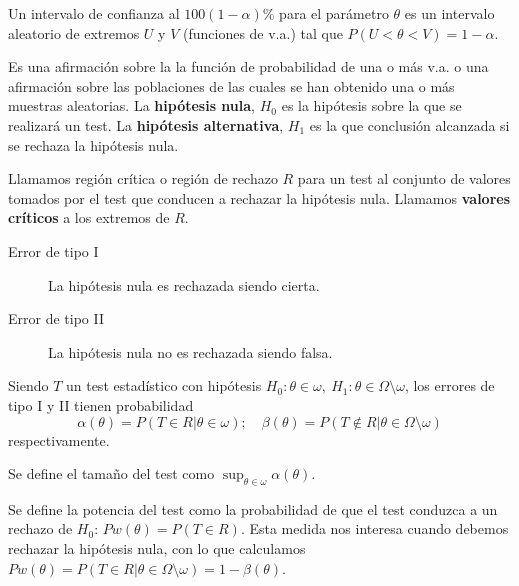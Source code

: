 	
\begin{definicion}
	Un intervalo de confianza al $100(1-\alpha)\%$ para el parámetro $\theta$ es un intervalo aleatorio de extremos $U$ y $V$ (funciones de v.a.) tal que $P(U < \theta < V) = 1-\alpha$.
\end{definicion}
	
\begin{definicion}
	Es una afirmación sobre la la función de probabilidad de una o más v.a. o una afirmación sobre las poblaciones de las cuales se han obtenido una o más muestras aleatorias. La \textbf{hipótesis nula}, $H_0$ es la hipótesis sobre la que se realizará un test. La \textbf{hipótesis alternativa}, $H_1$ es la que conclusión alcanzada si se rechaza la hipótesis nula.
\end{definicion}

\begin{definicion}
	Llamamos región crítica o región de rechazo $R$ para un test al conjunto de valores tomados por el test que conducen a rechazar la hipótesis nula. Llamamos \textbf{valores críticos} a los extremos de $R$.
\end{definicion}

\begin{definicion}\textit{}
	\begin{description}
	\item[Error de tipo I] La hipótesis nula es rechazada siendo cierta.
	\item[Error de tipo II] La hipótesis nula no es rechazada siendo falsa.
	\end{description}
\end{definicion}

	Siendo $T$ un test estadístico con hipótesis $H_0: \theta \in \omega, \ H_1: \theta \in \Omega \setminus \omega$, los errores de tipo I y II tienen probabilidad
	\[ 
	\alpha(\theta) = P(T \in R | \theta \in \omega); \quad
	\beta(\theta) = 
		P(T \not\in R | 
				\theta \in \Omega \setminus \omega)
	\]
	respectivamente.

\begin{definicion}
	Se define el tamaño del test como $\sup_{\theta \in \omega} \alpha(\theta)$.
\end{definicion}

\begin{definicion}
	Se define la potencia del test como la probabilidad de que el test conduzca a un rechazo de $H_0$: $Pw(\theta) = P(T \in R)$. Esta medida nos interesa cuando debemos rechazar la hipótesis nula, con lo que calculamos $Pw(\theta) = P(T \in R | \theta \in \Omega \setminus \omega) = 1 - \beta(\theta)$. 
\end{definicion}
	
